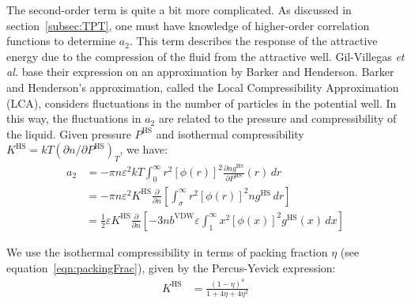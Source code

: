 \documentclass[letterpaper,twocolumn,amsmath,amssymb,prb]{revtex4-1}
\newcommand{\fixme}[1]{\textcolor{red}{\textbf{[#1]}}}
\begin{document}


The second-order term is quite a bit more complicated. As discussed in
section~\ref{subsec:TPT}, one must have knowledge of higher-order
correlation functions to determine $a_2$. This term describes the
response of the attractive energy due to the compression of the fluid
from the attractive well. Gil-Villegas \emph{et al.} base their
expression on an approximation by Barker and Henderson.\cite{Barker67}
Barker and Henderson's approximation, called the Local Compressibility
Approximation (LCA), considers fluctuations in the number of particles
in the potential well. In this way, the fluctuations in $a_2$ are
related to the pressure and compressibility of the liquid. Given
pressure $P^\text{HS}$ and isothermal compressibility $K^\text{HS} =
kT\left(\partial n /\partial P^\text{HS}\right)_T$, we have:
\begin{align}
  a_2 &= -\pi n \varepsilon^2kT\int_0^\infty r^2\left[\phi(r)\right]^2\frac{\partial n  g^\text{HS}}{\partial P^\text{HS}}(r)\,dr \nonumber \\
  &= -\pi n \varepsilon^2K^\text{HS}\frac{\partial}{\partial n }\left[\int_\sigma^\infty r^2\left[\phi(r)\right]^2 n  g^\text{HS}\,dr\right] \nonumber \\
  &= \frac{1}{2}\varepsilon K^\text{HS}\frac{\partial}{\partial n }\left[-3 n  b^\text{VDW}\varepsilon\int_1^\infty x^2\left[\phi(x)\right]^2 g^\text{HS}(x)\,dx \right]
\end{align}

We use the isothermal compressibility in terms of packing fraction
$\eta$ (see equation~\ref{eqn:packingFrac}), given by the Percus-Yevick expression:\cite{Barker76}
\begin{align}
  K^\text{HS} &= \frac{\left(1 - \eta\right)^4}{1 + 4\eta + 4\eta^2}
\end{align}
\end{document}
